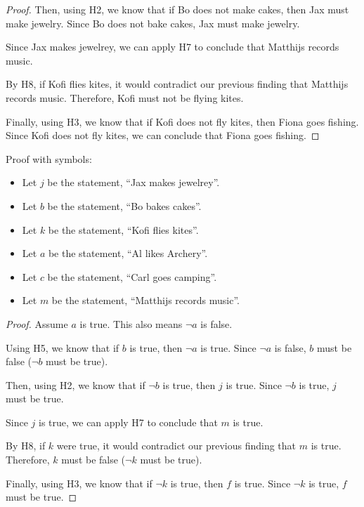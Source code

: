 \documentclass{article}
\begin{document}
\begin{enumerate}
\begin{proof}
    Then, using H2, we know that if Bo does not make cakes, then Jax must make jewelry. Since Bo does not bake cakes, Jax must make jewelry.

    Since Jax makes jewelrey, we can apply H7 to conclude that Matthijs records music.

    By H8, if Kofi flies kites, it would contradict our previous finding that Matthijs records music. Therefore, Kofi must not be flying kites.

    Finally, using H3, we know that if Kofi does not fly kites, then Fiona goes fishing. Since Kofi does not fly kites, we can conclude that Fiona goes fishing.

\end{proof}

Proof with symbols:

\begin{itemize}
    \item Let $j$ be the statement, ``Jax makes jewelrey''.
    \item Let $b$ be the statement, ``Bo bakes cakes''.
    \item Let $k$ be the statement, ``Kofi flies kites''.
    \item Let $a$ be the statement, ``Al likes Archery''.
    \item Let $c$ be the statement, ``Carl goes camping''.
    \item Let $m$ be the statement, ``Matthijs records music''.
    
 \end{itemize}

 \begin{proof}
    Assume $a$ is true. This also means $\neg a$ is false.

    Using H5, we know that if $b$ is true, then $\neg a$ is true. Since $\neg a$ is false, $b$ must be false ($\neg b$ must be true).

    Then, using H2, we know that if $\neg b$ is true, then $j$ is true. Since $\neg b$ is true, $j$ must be true.

    Since $j$ is true, we can apply H7 to conclude that $m$ is true.

    By H8, if $k$ were true, it would contradict our previous finding that $m$ is true. Therefore, $k$ must be false ($\neg k$ must be true).

    Finally, using H3, we know that if $\neg k$ is true, then $f$ is true. Since $\neg k$ is true, $f$ must be true.

\end{proof}


\end{enumerate}
\end{document}
